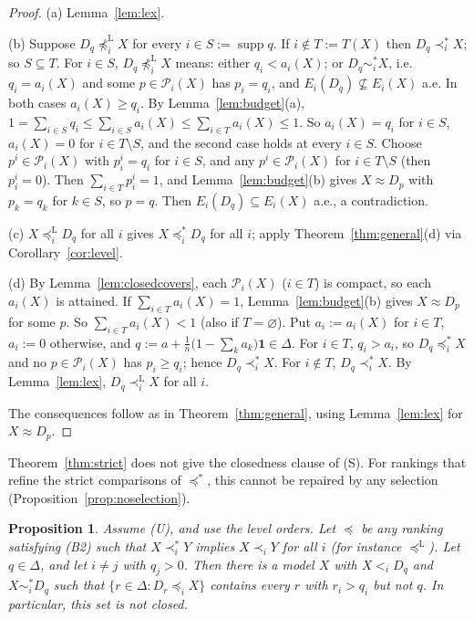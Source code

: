 \documentclass[11pt]{article}
\newtheorem{proposition}[theorem]{Proposition}
\theoremstyle{definition}
\newcommand{\one}{\mathbf 1}
\newcommand{\supp}{\operatorname{supp}}
\newcommand{\Pc}{\mathcal P}
\newcommand{\ws}{\preceq^{*}}
\newcommand{\wss}{\prec^{*}}
\newcommand{\wst}{\sim^{*}}
\newcommand{\wl}{\preceq^{\mathrm L}}
\newcommand{\wls}{\prec^{\mathrm L}}
\begin{document}
\begin{proof}
(a) Lemma~\ref{lem:lex}.

(b) Suppose $D_q\not\wl_iX$ for every $i\in S:=\supp q$. If $i\notin T:=T(X)$ then $D_q\wss_iX$; so $S\subseteq T$. For $i\in S$, $D_q\not\wl_iX$ means: either $q_i<a_i(X)$; or $D_q\wst_iX$, i.e.\ $q_i=a_i(X)$ and some $p\in\Pc_i(X)$ has $p_i=q_i$, and $E_i(D_q)\not\subseteq E_i(X)$ a.e. In both cases $a_i(X)\ge q_i$. By Lemma~\ref{lem:budget}(a), $1=\sum_{i\in S}q_i\le\sum_{i\in S}a_i(X)\le\sum_{i\in T}a_i(X)\le1$. So $a_i(X)=q_i$ for $i\in S$, $a_i(X)=0$ for $i\in T\setminus S$, and the second case holds at every $i\in S$. Choose $p^i\in\Pc_i(X)$ with $p^i_i=q_i$ for $i\in S$, and any $p^i\in\Pc_i(X)$ for $i\in T\setminus S$ (then $p^i_i=0$). Then $\sum_{i\in T}p^i_i=1$, and Lemma~\ref{lem:budget}(b) gives $X\approx D_p$ with $p_k=q_k$ for $k\in S$, so $p=q$. Then $E_i(D_q)\subseteq E_i(X)$ a.e., a contradiction.

(c) $X\wl_iD_q$ for all $i$ gives $X\ws_iD_q$ for all $i$; apply Theorem~\ref{thm:general}(d) via Corollary~\ref{cor:level}.

(d) By Lemma~\ref{lem:closedcovers}, each $\Pc_i(X)$ ($i\in T$) is compact, so each $a_i(X)$ is attained. If $\sum_{i\in T}a_i(X)=1$, Lemma~\ref{lem:budget}(b) gives $X\approx D_p$ for some $p$. So $\sum_{i\in T}a_i(X)<1$ (also if $T=\varnothing$). Put $a_i:=a_i(X)$ for $i\in T$, $a_i:=0$ otherwise, and $q:=a+\frac1n\big(1-\sum_ka_k\big)\one\in\Delta$. For $i\in T$, $q_i>a_i$, so $D_q\ws_iX$ and no $p\in\Pc_i(X)$ has $p_i\ge q_i$; hence $D_q\wss_iX$. For $i\notin T$, $D_q\wss_iX$. By Lemma~\ref{lem:lex}, $D_q\wls_iX$ for all $i$.

The consequences follow as in Theorem~\ref{thm:general}, using Lemma~\ref{lem:lex} for $X\approx D_p$.
\end{proof}

Theorem~\ref{thm:strict} does not give the closedness clause of (S). For rankings that refine the strict comparisons of $\ws$, this cannot be repaired by any selection (Proposition~\ref{prop:noselection}).

\begin{proposition}\label{prop:noclosed}
Assume (U), and use the level orders. Let $\preceq$ be any ranking satisfying (B2) such that $X\wss_iY$ implies $X\prec_iY$ for all $i$ (for instance $\wl$). Let $q\in\Delta$, and let $i\ne j$ with $q_j>0$. Then there is a model $X$ with $X<_iD_q$ and $X\wst_iD_q$ such that $\{r\in\Delta:D_r\preceq_iX\}$ contains every $r$ with $r_i>q_i$ but not $q$. In particular, this set is not closed.
\end{proposition}
\end{document}
